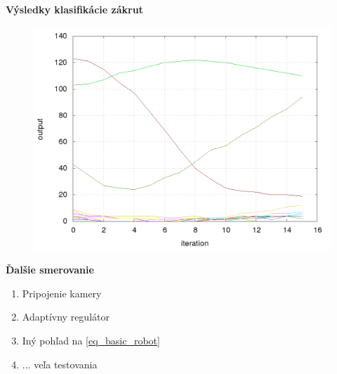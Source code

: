\documentclass[xcolor=dvipsnames]{beamer}
\begin{document}
\begin{frame}{\bf Výsledky klasifikácie zákrut}

\begin{figure}[ht]
\begin{center}
\begin{minipage}{0.8\linewidth}
\begin{center}
\includegraphics[width=1.0\textwidth]{prediction/predictor.png}
\end{center}
\end{minipage}
\end{center}
\end{figure}

\end{frame}

\begin{frame}{\bf Ďalšie smerovanie}

\begin{enumerate}
	\item Pripojenie kamery
	\item Adaptívny regulátor
    \item Iný pohľad na \ref{eq_basic_robot}
	\item ... veľa testovania
\end{enumerate}

\end{frame}
\end{document}
